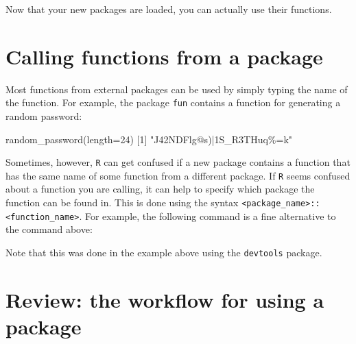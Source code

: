 \documentclass[
]{book}
\newenvironment{Shaded}{\begin{snugshade}}{\end{snugshade}}
\newcommand{\AttributeTok}[1]{\textcolor[rgb]{0.77,0.63,0.00}{#1}}
\newcommand{\DecValTok}[1]{\textcolor[rgb]{0.00,0.00,0.81}{#1}}
\newcommand{\FunctionTok}[1]{\textcolor[rgb]{0.00,0.00,0.00}{#1}}
\newcommand{\NormalTok}[1]{#1}
\newcommand{\SpecialCharTok}[1]{\textcolor[rgb]{0.00,0.00,0.00}{#1}}
\newcommand{\StringTok}[1]{\textcolor[rgb]{0.31,0.60,0.02}{#1}}
\begin{document}
Now that your new packages are loaded, you can actually use their functions.

\hypertarget{calling-functions-from-a-package}{%
\section*{Calling functions from a package}\label{calling-functions-from-a-package}}

Most functions from external packages can be used by simply typing the name of the function. For example, the package \texttt{fun} contains a function for generating a random password:

\begin{Shaded}
\begin{Highlighting}[]
\FunctionTok{random\_password}\NormalTok{(}\AttributeTok{length=}\DecValTok{24}\NormalTok{)}
\NormalTok{[}\DecValTok{1}\NormalTok{] }\StringTok{"J42NDFlg@s)|1S\_R3THuq\%=k"}
\end{Highlighting}
\end{Shaded}

Sometimes, however, \texttt{R} can get confused if a new package contains a function that has the same name of some function from a different package. If \texttt{R} seems confused about a function you are calling, it can help to specify which package the function can be found in. This is done using the syntax \texttt{\textless{}package\_name\textgreater{}::\textless{}function\_name\textgreater{}}. For example, the following command is a fine alternative to the command above:

\begin{Shaded}
\end{Shaded}

Note that this was done in the example above using the \texttt{devtools} package.

\hypertarget{review-the-workflow-for-using-a-package}{%
\section*{Review: the workflow for using a package}\label{review-the-workflow-for-using-a-package}}
\end{document}
